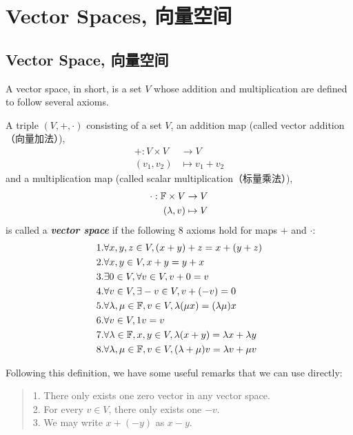 \section{Vector Spaces, 向量空间}

\subsection{Vector Space, 向量空间}
A vector space, in short, is a set $V$ whose addition and multiplication are defined to follow several axioms.
\begin{definition}
    A triple $(V, +, \cdot)$ consisting of a set $V$, an addition map (called vector addition（向量加法）),
    \begin{align*}
        +: V \times V & \to V \\
        (v_1, v_2) & \mapsto v_1+v_2
    \end{align*}
    and a multiplication map (called scalar multiplication（标量乘法）),
    \begin{align*}
        \cdot: \mathbb{F} \times V & \to V \\
        (\lambda, v) & \mapsto V
    \end{align*}
    is called a \textbf{\textit{vector space}} if the following $8$ axioms hold for maps $+$ and $\cdot$:
    \begin{align*}
        & 1. \forall x, y, z \in V, (x+y)+z = x+(y+z) \\
        & 2. \forall x, y \in V, x + y = y + x \\
        & 3. \exists 0 \in V, \forall v \in V, v + 0 = v \\
        & 4. \forall v \in V, \exists -v \in V, v + (-v) = 0 \\
        & 5. \forall \lambda, \mu \in \mathbb{F}, v \in V, \lambda(\mu x) = (\lambda \mu) x \\
        & 6. \forall v \in V, 1v = v \\
        & 7. \forall \lambda \in \mathbb{F}, x, y \in V, \lambda(x+y) = \lambda x + \lambda y \\
        & 8. \forall \lambda, \mu \in \mathbb{F}, v \in V, (\lambda + \mu)v = \lambda v + \mu v
    \end{align*}
\end{definition}
Following this definition, we have some useful remarks that we can use directly:
\begin{quote}
    1. There only exists one zero vector in any vector space. \\
    2. For every $v \in V$, there only exists one $-v$. \\
    3. We may write $x+(-y)$ as $x-y$.
\end{quote}
